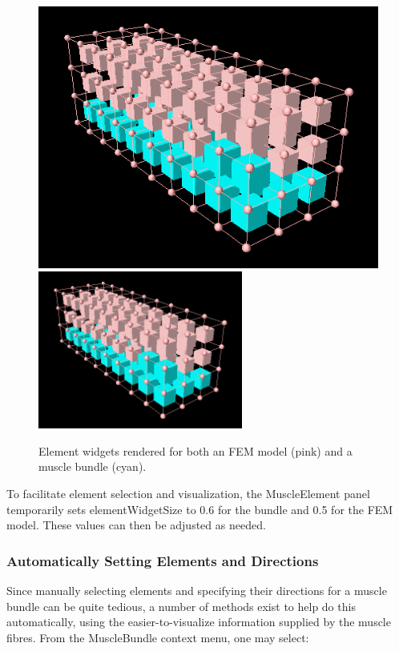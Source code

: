 \documentclass{article}
\begin{document}
\begin{figure}
\begin{center}
\iflatexml
\includegraphics[]{images/elementWidgets}
\else
\includegraphics[width=0.60\textwidth]{images/elementWidgets}
\fi
\end{center}
\caption{Element widgets rendered for both an FEM model (pink) and a muscle bundle (cyan).}%
\label{elementWidgetsFig}
\end{figure}

To facilitate element selection and visualization,
the MuscleElement panel
temporarily sets {\sf elementWidgetSize} to 0.6 for the bundle and 0.5 for
the FEM model. These values can then be adjusted as needed.

\subsubsection{Automatically Setting Elements and Directions}

Since manually selecting elements and specifying their directions for
a muscle bundle can be quite tedious, a number of methods exist to
help do this automatically, using the easier-to-visualize information
supplied by the muscle fibres. From the MuscleBundle context menu, one
may select:
\end{document}
